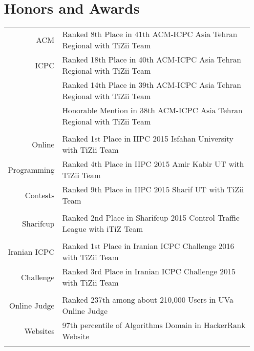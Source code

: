 \documentclass[a4paper,10pt]{article}
\newcommand{\linkSign}{
	{\footnotesize\space\faExternalLink}}
\newcommand{\ICPCLink}{https://icpc.baylor.edu/ICPCID/AW4BCNUI7GGZ}
\newcommand{\IndeedPrimePage}{https://www.hackerrank.com/indeed-prime-codesprint}
\newcommand{\IndeedPrimeRanks}{https://www.hackerrank.com/contests/indeed-prime-codesprint/leaderboard/10}
\newcommand{\SharifcupLink}{http://sharifcup.sharif.ir/\#!p=1036}
\newcommand{\ICPCChLink}{http://icpc.sharif.edu/acmicpc15/challenge-tournament/}
\newcommand{\UVaLink}{https://uva.onlinejudge.org/index.php?option=com_onlinejudge\&Itemid=20\&page=show_authorsrank\&limit=50\&limitstart=200}
\newcommand{\HackerRankLink}{https://www.hackerrank.com/imn_irdst}
\begin{document}
	\section{Honors and Awards}
	\begin{tabular}{r|p{11cm}}
		\textnormal{ACM} & {\small Ranked 8th Place in 41th ACM-ICPC Asia Tehran Regional with TiZii Team}\href{\ICPCLink}{\linkSign} \\
		\textnormal{ICPC} & {\small Ranked 18th Place in 40th ACM-ICPC Asia Tehran Regional with TiZii Team}\href{\ICPCLink}{\linkSign} \\
		\textnormal{} & {\small Ranked 14th Place in 39th ACM-ICPC Asia Tehran Regional with TiZii Team}\href{\ICPCLink}{\linkSign} \\
		\textnormal{}& {\small Honorable Mention in 38th ACM-ICPC Asia Tehran Regional with TiZii Team}\href{\ICPCLink}{\linkSign}\\
		\multicolumn{2}{c}{} \\
		
		\textnormal{Online} & {\small Ranked 1st Place in IIPC 2015 Isfahan University with TiZii Team} \href{\ICPCLink}{\linkSign}\\
		\textnormal{Programming} & {\small Ranked 4th Place in IIPC 2015 Amir Kabir UT with TiZii Team\href{\ICPCLink}{\linkSign}}\\
		\textnormal{Contests} & {\small Ranked 9th Place in IIPC 2015 Sharif UT with TiZii Team}\href{\ICPCLink}{\linkSign}\\
		\multicolumn{2}{c}{} \\
		
		\textnormal{Sharifcup} & {\small Ranked 2nd Place in Sharifcup 2015 Control Traffic League with iTiZ Team}\href{\SharifcupLink}{\linkSign}\\
		\multicolumn{2}{c}{} \\
		
		\textnormal{Iranian ICPC} & {\small Ranked 1st Place in Iranian ICPC Challenge 2016 with TiZii Team}\href{\ICPCChLink}{\linkSign} \\
		\textnormal{Challenge} & {\small Ranked 3rd Place in Iranian ICPC Challenge 2015 with TiZii Team}\href{\ICPCChLink}{\linkSign} \\
		\multicolumn{2}{c}{} \\
		
		\textnormal{Online Judge} & {\small Ranked 237th among about 210,000 Users in UVa Online Judge}\href{\UVaLink}{\linkSign} \\
		\textnormal{Websites} & {\small 97th percentile of Algorithms Domain in HackerRank Website}\href{\HackerRankLink}{\linkSign} \\
		\multicolumn{2}{c}{} \\
		

\end{tabular}
\end{document}
